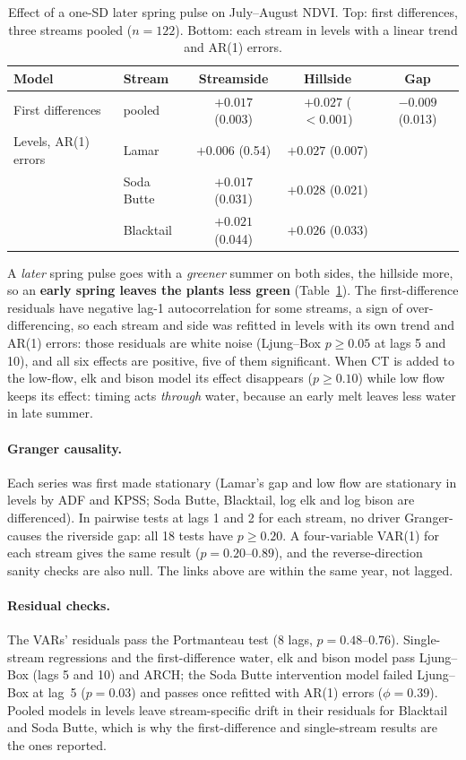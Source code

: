 \documentclass[11pt,a4paper]{article}
\begin{document}
\begin{table}[H]
\centering\small
\caption{Effect of a one-SD later spring pulse on July--August NDVI. Top: first differences, three streams pooled ($n=122$). Bottom: each stream in levels with a linear trend and AR(1) errors.}\label{tab:ct}
\begin{tabular}{@{}llccc@{}}
\toprule
Model & Stream & Streamside & Hillside & Gap \\
\midrule
First differences & pooled & $+0.017$ (0.003) & $+0.027$ ($<0.001$) & $-0.009$ (0.013) \\
\addlinespace
Levels, AR(1) errors & Lamar & $+0.006$ (0.54) & $+0.027$ (0.007) & \\
 & Soda Butte & $+0.017$ (0.031) & $+0.028$ (0.021) & \\
 & Blacktail & $+0.021$ (0.044) & $+0.026$ (0.033) & \\
\bottomrule
\end{tabular}
\end{table}

A \emph{later} spring pulse goes with a \emph{greener} summer on both sides, the hillside more, so an \textbf{early spring leaves the plants less green} (Table~\ref{tab:ct}). The first-difference residuals have negative lag-1 autocorrelation for some streams, a sign of over-differencing, so each stream and side was refitted in levels with its own trend and AR(1) errors: those residuals are white noise (Ljung--Box $p\ge0.05$ at lags 5 and 10), and all six effects are positive, five of them significant. When CT is added to the low-flow, elk and bison model its effect disappears ($p\ge0.10$) while low flow keeps its effect: timing acts \emph{through} water, because an early melt leaves less water in late summer.

\paragraph{Granger causality.} Each series was first made stationary (Lamar's gap and low flow are stationary in levels by ADF and KPSS; Soda Butte, Blacktail, log elk and log bison are differenced). In pairwise tests at lags 1 and 2 for each stream, no driver Granger-causes the riverside gap: all 18 tests have $p\ge0.20$. A four-variable VAR(1) for each stream gives the same result ($p=0.20$--$0.89$), and the reverse-direction sanity checks are also null. The links above are within the same year, not lagged.

\paragraph{Residual checks.} The VARs' residuals pass the Portmanteau test (8 lags, $p=0.48$--$0.76$). Single-stream regressions and the first-difference water, elk and bison model pass Ljung--Box (lags 5 and 10) and ARCH; the Soda Butte intervention model failed Ljung--Box at lag~5 ($p=0.03$) and passes once refitted with AR(1) errors ($\phi=0.39$). Pooled models in levels leave stream-specific drift in their residuals for Blacktail and Soda Butte, which is why the first-difference and single-stream results are the ones reported.
\end{document}
